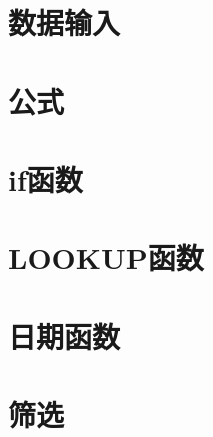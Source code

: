 \documentclass[cn,blue,12pt,normal]{elegantnote}
\begin{document}
\begin{sloppypar} %


\setmainfont{Times New Roman}

\tableofcontents

\newpage
\section{数据输入}

\newpage
\section{公式}

\newpage
\section{if函数}

\newpage
\section{LOOKUP函数}

\newpage
\section{日期函数}

\newpage
\section{筛选}




\end{sloppypar}
\end{document}
